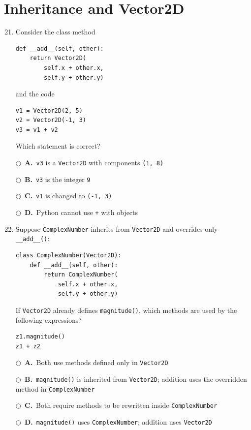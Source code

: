 \documentclass[11pt]{article}
\newcommand{\choice}[2]{%
    \par\noindent
    \(\bigcirc\)\ \textbf{#1.}\ #2
}
\begin{document}
\section*{Inheritance and Vector2D}

\begin{enumerate}
\setcounter{enumi}{20}

\item Consider the class method

\begin{verbatim}
def __add__(self, other):
    return Vector2D(
        self.x + other.x,
        self.y + other.y)
\end{verbatim}

and the code

\begin{verbatim}
v1 = Vector2D(2, 5)
v2 = Vector2D(-1, 3)
v3 = v1 + v2
\end{verbatim}

Which statement is correct?

\choice{A}{\texttt{v3} is a \texttt{Vector2D} with components \texttt{(1, 8)}}
\choice{B}{\texttt{v3} is the integer \texttt{9}}
\choice{C}{\texttt{v1} is changed to \texttt{(-1, 3)}}
\choice{D}{Python cannot use \texttt{+} with objects}

\item Suppose \texttt{ComplexNumber} inherits from \texttt{Vector2D} and overrides only \texttt{\_\_add\_\_()}:

\begin{verbatim}
class ComplexNumber(Vector2D):
    def __add__(self, other):
        return ComplexNumber(
            self.x + other.x,
            self.y + other.y)
\end{verbatim}

If \texttt{Vector2D} already defines \texttt{magnitude()}, which methods are used by the following expressions?

\begin{verbatim}
z1.magnitude()
z1 + z2
\end{verbatim}

\choice{A}{Both use methods defined only in \texttt{Vector2D}}
\choice{B}{\texttt{magnitude()} is inherited from \texttt{Vector2D}; addition uses the overridden method in \texttt{ComplexNumber}}
\choice{C}{Both require methods to be rewritten inside \texttt{ComplexNumber}}
\choice{D}{\texttt{magnitude()} uses \texttt{ComplexNumber}; addition uses \texttt{Vector2D}}


\end{enumerate}
\end{document}
